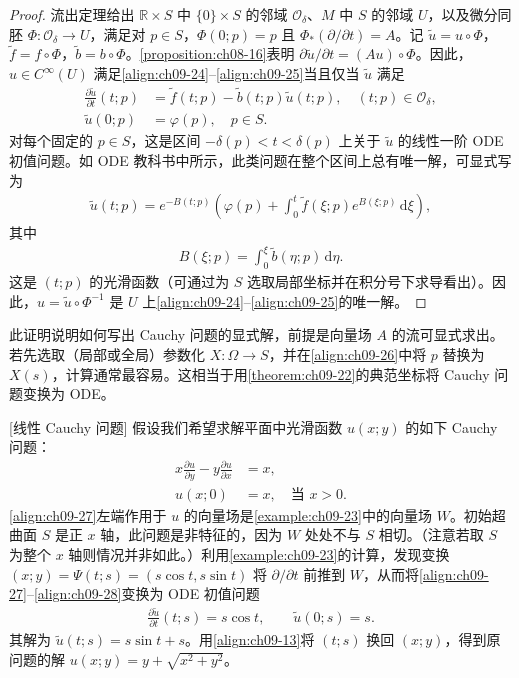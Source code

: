 \documentclass[../../main.tex]{subfiles}
\begin{document}
\begin{proof}
流出定理给出 $\mathbb{R}\times S$ 中 $\{0\}\times S$ 的邻域 $\mathcal{O}_\delta$、$M$ 中 $S$ 的邻域 $U$，以及微分同胚 $\Phi\colon\mathcal{O}_\delta\to U$，满足对 $p\in S$，$\Phi(0;p)=p$ 且 $\Phi_*(\partial/\partial t)=A$。记 $\widetilde{u}=u\circ\Phi$，$\widetilde{f}=f\circ\Phi$，$\widetilde{b}=b\circ\Phi$。\cref{proposition:ch08-16}表明 $\partial\widetilde{u}/\partial t=(Au)\circ\Phi$。因此，$u\in C^\infty(U)$ 满足\eqref{align:ch09-24}--\eqref{align:ch09-25}当且仅当 $\widetilde{u}$ 满足
\begin{align}
\frac{\partial\widetilde{u}}{\partial t}(t;p)&=\widetilde{f}(t;p)-\widetilde{b}(t;p)\widetilde{u}(t;p),\quad (t;p)\in\mathcal{O}_\delta,\nonumber\\
\widetilde{u}(0;p)&=\varphi(p),\quad p\in S. \label{align:ch09-26}
\end{align}
对每个固定的 $p\in S$，这是区间 $-\delta(p)<t<\delta(p)$ 上关于 $\widetilde{u}$ 的线性一阶 ODE 初值问题。如 ODE 教科书中所示，此类问题在整个区间上总有唯一解，可显式写为
\begin{align*}
\widetilde{u}(t;p)=e^{-B(t;p)}\left(\varphi(p)+\int_0^t\widetilde{f}(\xi;p)e^{B(\xi;p)}\,\mathrm{d}\xi\right),
\end{align*}
其中
\begin{align*}
B(\xi;p)=\int_0^\xi\widetilde{b}(\eta;p)\,\mathrm{d}\eta.
\end{align*}
这是 $(t;p)$ 的光滑函数（可通过为 $S$ 选取局部坐标并在积分号下求导看出）。因此，$u=\widetilde{u}\circ\Phi^{-1}$ 是 $U$ 上\eqref{align:ch09-24}--\eqref{align:ch09-25}的唯一解。
\end{proof}

此证明说明如何写出 Cauchy 问题的显式解，前提是向量场 $A$ 的流可显式求出。若先选取（局部或全局）参数化 $X\colon\Omega\to S$，并在\eqref{align:ch09-26}中将 $p$ 替换为 $X(s)$，计算通常最容易。这相当于用\cref{theorem:ch09-22}的典范坐标将 Cauchy 问题变换为 ODE。

\begin{example}\label{example:ch09-52}[线性 Cauchy 问题]
假设我们希望求解平面中光滑函数 $u(x;y)$ 的如下 Cauchy 问题：
\begin{align}
x\frac{\partial u}{\partial y}-y\frac{\partial u}{\partial x}&=x, \label{align:ch09-27}\\
u(x;0)&=x,\quad \text{当 }x>0. \label{align:ch09-28}
\end{align}
\eqref{align:ch09-27}左端作用于 $u$ 的向量场是\cref{example:ch09-23}中的向量场 $W$。初始超曲面 $S$ 是正 $x$ 轴，此问题是非特征的，因为 $W$ 处处不与 $S$ 相切。（注意若取 $S$ 为整个 $x$ 轴则情况并非如此。）利用\cref{example:ch09-23}的计算，发现变换 $(x;y)=\Psi(t;s)=(s\cos t,s\sin t)$ 将 $\partial/\partial t$ 前推到 $W$，从而将\eqref{align:ch09-27}--\eqref{align:ch09-28}变换为 ODE 初值问题
\begin{align*}
\frac{\partial\widetilde{u}}{\partial t}(t;s)=s\cos t,\qquad \widetilde{u}(0;s)=s.
\end{align*}
其解为 $\widetilde{u}(t;s)=s\sin t+s$。用\eqref{align:ch09-13}将 $(t;s)$ 换回 $(x;y)$，得到原问题的解 $u(x;y)=y+\sqrt{x^2+y^2}$。
\end{example}
\end{document}
